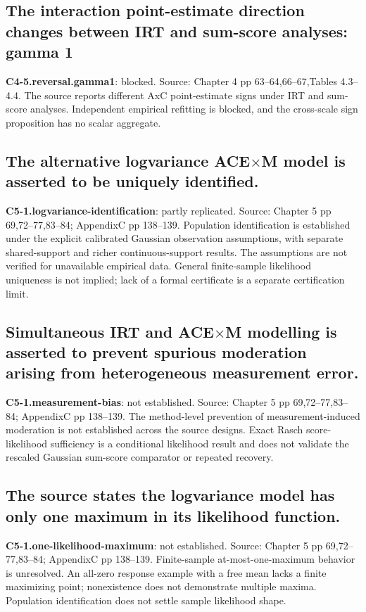 \documentclass[11pt]{article}
\begin{document}
\subsection{The interaction point-estimate direction changes between IRT and sum-score analyses: gamma 1}
\textbf{C4-5.reversal.gamma1}: blocked. Source: Chapter 4 pp 63--64,66--67,Tables 4.3--4.4. The source reports different AxC point-estimate signs under IRT and sum-score analyses. Independent empirical refitting is blocked, and the cross-scale sign proposition has no scalar aggregate.
\subsection{The alternative logvariance ACE$\times$M model is asserted to be uniquely identified.}
\textbf{C5-1.logvariance-identification}: partly replicated. Source: Chapter 5 pp 69,72--77,83--84; AppendixC pp 138--139. Population identification is established under the explicit calibrated Gaussian observation assumptions, with separate shared-support and richer continuous-support results. The assumptions are not verified for unavailable empirical data. General finite-sample likelihood uniqueness is not implied; lack of a formal certificate is a separate certification limit.
\subsection{Simultaneous IRT and ACE$\times$M modelling is asserted to prevent spurious moderation arising from heterogeneous measurement error.}
\textbf{C5-1.measurement-bias}: not established. Source: Chapter 5 pp 69,72--77,83--84; AppendixC pp 138--139. The method-level prevention of measurement-induced moderation is not established across the source designs. Exact Rasch score-likelihood sufficiency is a conditional likelihood result and does not validate the rescaled Gaussian sum-score comparator or repeated recovery.
\subsection{The source states the logvariance model has only one maximum in its likelihood function.}
\textbf{C5-1.one-likelihood-maximum}: not established. Source: Chapter 5 pp 69,72--77,83--84; AppendixC pp 138--139. Finite-sample at-most-one-maximum behavior is unresolved. An all-zero response example with a free mean lacks a finite maximizing point; nonexistence does not demonstrate multiple maxima. Population identification does not settle sample likelihood shape.
\end{document}
